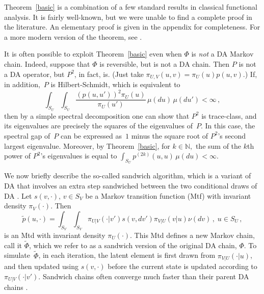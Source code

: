 \documentclass[11pt]{article}
\begin{document}
	Theorem~\ref{basic} is a combination of a few standard results
        in classical functional analysis.  It is fairly well-known,
        but we were unable to find a complete proof in the literature.
        An elementary proof is given in the appendix for
        completeness. For a more modern version of the theorem, see
        \cite{brislawn1988kernels}.

        It is often possible to exploit Theorem~\ref{basic} even when
        $\Phi$ is \textit{not} a DA Markov chain.  Indeed, suppose
        that $\Phi$ is reversible, but is not a DA chain.  Then $P$ is
        not a DA operator, but $P^2$, in fact, is.
        (Just take $\pi_{U,V}(u,v) = \pi_U(u)p(u,v)$.)  If, in
        addition,~$P$ is Hilbert-Schmidt, which is equivalent to
	\[
	\int_{S_U} \int_{S_U} \frac{(p(u,u'))^2 \pi_U(u)}{\pi_U(u')}
        \, \mu(du) \, \mu(du') < \infty \,,
        \]
        then by a simple spectral decomposition \citep[see e.g.][ \S 28
        Corollary 2.1]{helmberg2014introduction} one can show that
        $P^2$ is trace-class, and its eigenvalues are precisely the
        squares of the eigenvalues of~$P$.  In this case, the spectral
        gap of~$P$ can be expressed as~$1$ minus the square root of
        $P^2$'s second largest eigenvalue.  Moreover, by
        Theorem~\ref{basic}, for $k \in \mathbb{N},$ the sum of the
        $k$th power of $P^2$'s eigenvalues is equal to $\int_{S_U}
        p^{(2k)}(u,u) \, \mu(du) < \infty$.

        We now briefly describe the so-called sandwich algorithm,
        which is a variant of DA that involves an extra step
        sandwiched between the two conditional draws of DA
        \citep{liu1999parameter,hobert2008theoretical}.  Let
        $s(v,\cdot), \, v \in S_V$ be a Markov transition function
        (Mtf) with invariant density $\pi_V(\cdot)$. Then
	\begin{equation} \label{sandwich} \tilde{p}(u,\cdot) =
          \int_{S_V}\int_{S_V} \pi_{U|V}(\cdot|v') s(v,dv')
          \pi_{V|U}(v|u) \nu(dv) \,, \; u \in S_U\,,
	\end{equation}
	is an Mtd with invariant density $\pi_U(\cdot)$.  This Mtd
        defines a new Markov chain, call it $\tilde{\Phi}$, which we
        refer to as a sandwich version of the original DA chain,
        $\Phi$.  To simulate~$\tilde{\Phi}$, in each iteration, the
        latent element is first drawn from $\pi_{V|U}(\cdot|u)$, and
        then updated using $s(v,\cdot)$ before the current state is
        updated according to $\pi_{U|V}(\cdot|v')$.  Sandwich chains
        often converge much faster than their parent DA chains
        \citep[see e.g.][]{khare2011spectral}.
\end{document}

